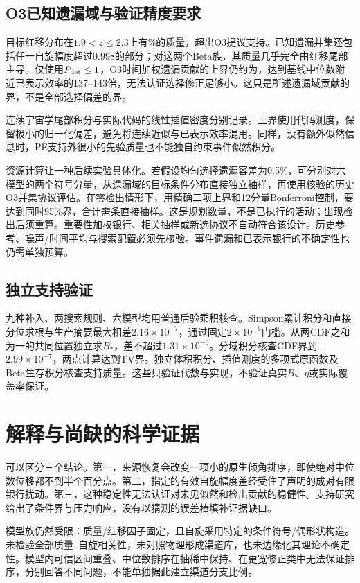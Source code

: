 \subsection{O3已知遗漏域与验证精度要求}
目标红移分布在$1.9<z\leq2.3$上有\DataTailMass\%的质量，超出O3提议支持。已知遗漏并集还包括任一自旋幅度超过0.998的部分；对这两个Beta族，其质量几乎完全由红移尾部主导。仅使用$P_{\rm det}\leq1$，O3时间加权遗漏贡献的上界仍约为\DataTailBound，达到基线中位数附近已表示效率的137--143倍，无法认证选择修正足够小。这只是所述遗漏域贡献的界，不是全部选择偏差的界。

连续宇宙学尾部积分与实际代码的线性插值密度分别记录。上界使用代码测度，保留极小的归一化偏差，避免将连续近似与已表示效率混用。同样，没有额外似然信息时，PE支持外很小的先验质量也不能独自约束事件似然积分。

资源计算让一种后续实验具体化。若假设均匀选择遗漏容差为0.5\%，可分别对六模型的两个符号分量，从遗漏域的目标条件分布直接独立抽样，再使用核验的历史O3并集协议评估。在零检出情形下，用精确二项上界和12分量Bonferroni控制，要达到同时95\%界，合计需\DataTailPlan{}条直接抽样。这是规划数量，不是已执行的活动；出现检出后须重算。重要性加权银行、相关抽样或新选协议不自动符合该设计。历史参考、噪声/时间平均与搜索配置必须先核验。事件遗漏和已表示银行的不确定性也仍需单独预算。

\subsection{独立支持验证}
九种补入、两搜索规则、六模型均用普通后验乘积核查。Simpson累计积分和直接分位求根与生产摘要最大相差$2.16\times10^{-7}$，通过固定$2\times10^{-6}$门槛。从两CDF之和为一的共同位置独立求$B_*$，差不超过$1.31\times10^{-6}$。分域积分核查CDF界到$2.99\times10^{-7}$，两点计算达到TV界。独立体积积分、插值测度的多项式原函数及Beta生存积分核查支持质量。这些只验证代数与实现，不验证真实$B$、$\eta$或实际覆盖率保证。

\FloatBarrier
\section{解释与尚缺的科学证据}
可以区分三个结论。第一，来源恢复会改变一项小的原生倾角排序，即使绝对中位数位移都不到半个百分点。第二，指定的有效自旋幅度差经受住了声明的成对有限银行扰动。第三，这种稳定性无法认证对未见似然和检出贡献的稳健性。支持研究给出了条件界与压力响应，没有以猜测的误差棒填补证据缺口。

模型族仍然受限：质量/红移因子固定，且自旋采用特定的条件符号/偶形状构造。未检验全部质量--自旋相关性，未对照物理形成渠道库，也未边缘化其理论不确定性。模型内可信区间重叠、中位数排序在抽稀中保持、在更宽修正类中无法保证排序，分别回答不同问题，不能单独据此建立渠道分支比例。

